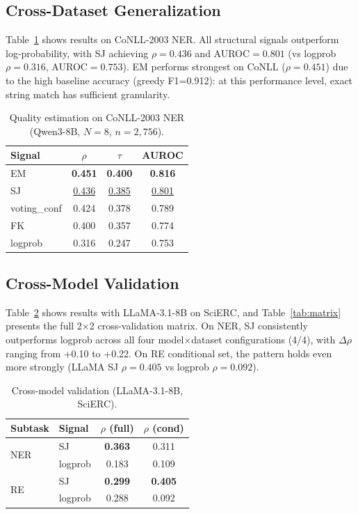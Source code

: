 \documentclass[11pt,a4paper]{article}
\begin{document}
\subsection{Cross-Dataset Generalization}
\label{sec:cross_dataset}

Table~\ref{tab:conll} shows results on CoNLL-2003 NER.
All structural signals outperform log-probability, with SJ achieving $\rho{=}0.436$ and AUROC${=}0.801$ (vs logprob $\rho{=}0.316$, AUROC${=}0.753$).
EM performs strongest on CoNLL ($\rho{=}0.451$) due to the high baseline accuracy (greedy F1=0.912): at this performance level, exact string match has sufficient granularity.

\begin{table}[t]
\centering
\small
\caption{Quality estimation on CoNLL-2003 NER (Qwen3-8B, $N{=}8$, $n{=}2{,}756$).}
\label{tab:conll}
\begin{tabular}{l ccc}
\toprule
Signal & $\rho$ & $\tau$ & AUROC \\
\midrule
EM            & \textbf{0.451} & \textbf{0.400} & \textbf{0.816} \\
SJ            & \underline{0.436} & \underline{0.385} & \underline{0.801} \\
voting\_conf  & 0.424 & 0.378 & 0.789 \\
FK            & 0.400 & 0.357 & 0.774 \\
logprob       & 0.316 & 0.247 & 0.753 \\
\bottomrule
\end{tabular}
\end{table}

\subsection{Cross-Model Validation}
\label{sec:cross_model}

Table~\ref{tab:crossmodel} shows results with LLaMA-3.1-8B on SciERC, and Table~\ref{tab:matrix} presents the full 2$\times$2 cross-validation matrix.
On NER, SJ consistently outperforms logprob across all four model$\times$dataset configurations (4/4), with $\Delta\rho$ ranging from +0.10 to +0.22.
On RE conditional set, the pattern holds even more strongly (LLaMA SJ $\rho{=}0.405$ vs logprob $\rho{=}0.092$).

\begin{table}[t]
\centering
\small
\caption{Cross-model validation (LLaMA-3.1-8B, SciERC).}
\label{tab:crossmodel}
\begin{tabular}{ll cc}
\toprule
Subtask & Signal & $\rho$ (full) & $\rho$ (cond) \\
\midrule
\multirow{2}{*}{NER} & SJ & \textbf{0.363} & 0.311 \\
                      & logprob & 0.183 & 0.109 \\
\midrule
\multirow{2}{*}{RE}  & SJ & \textbf{0.299} & \textbf{0.405} \\
                      & logprob & 0.288 & 0.092 \\
\bottomrule
\end{tabular}
\end{table}
\end{document}
